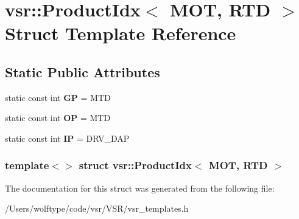 \hypertarget{structvsr_1_1_product_idx_3_01_m_o_t_00_01_r_t_d_01_4}{\section{vsr\-:\-:Product\-Idx$<$ M\-O\-T, R\-T\-D $>$ Struct Template Reference}
\label{structvsr_1_1_product_idx_3_01_m_o_t_00_01_r_t_d_01_4}
}
\subsection*{Static Public Attributes}
\begin{DoxyCompactItemize}
\item 
\hypertarget{structvsr_1_1_product_idx_3_01_m_o_t_00_01_r_t_d_01_4_a1340e14ff72e33343bfd6e78da82eb1d}{static const int {\bfseries G\-P} = M\-T\-D}\label{structvsr_1_1_product_idx_3_01_m_o_t_00_01_r_t_d_01_4_a1340e14ff72e33343bfd6e78da82eb1d}

\item 
\hypertarget{structvsr_1_1_product_idx_3_01_m_o_t_00_01_r_t_d_01_4_a73744d15e620bbf01e0e015bde641cc7}{static const int {\bfseries O\-P} = M\-T\-D}\label{structvsr_1_1_product_idx_3_01_m_o_t_00_01_r_t_d_01_4_a73744d15e620bbf01e0e015bde641cc7}

\item 
\hypertarget{structvsr_1_1_product_idx_3_01_m_o_t_00_01_r_t_d_01_4_af169d28cc41ed9d29fc40efd9bd3019b}{static const int {\bfseries I\-P} = D\-R\-V\-\_\-\-D\-A\-P}\label{structvsr_1_1_product_idx_3_01_m_o_t_00_01_r_t_d_01_4_af169d28cc41ed9d29fc40efd9bd3019b}

\end{DoxyCompactItemize}
\subsubsection*{template$<$$>$ struct vsr\-::\-Product\-Idx$<$ M\-O\-T, R\-T\-D $>$}



The documentation for this struct was generated from the following file\-:\begin{DoxyCompactItemize}
\item 
/\-Users/wolftype/code/vsr/\-V\-S\-R/vsr\-\_\-templates.\-h\end{DoxyCompactItemize}
